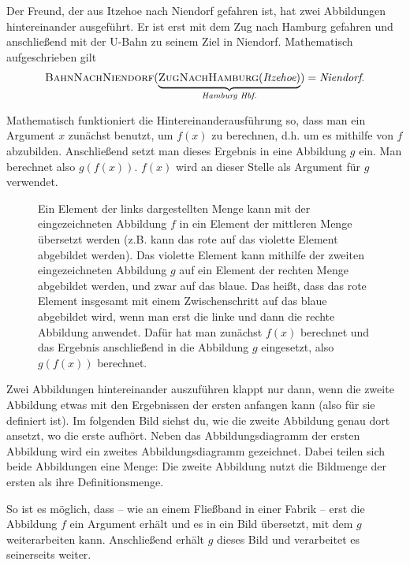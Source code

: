 \documentclass[../../main.tex]{subfiles}
\begin{document}
\begin{example}
    Der Freund, der aus Itzehoe nach Niendorf gefahren ist, hat zwei Abbildungen hintereinander ausgeführt. Er ist erst mit dem Zug nach Hamburg gefahren und anschließend mit der U-Bahn zu seinem Ziel in Niendorf. Mathematisch aufgeschrieben gilt \[\textsc{BahnNachNiendorf}(\underbrace{\textsc{ZugNachHamburg}(\emph{Itzehoe})}_{\emph{Hamburg Hbf.}})=\emph{Niendorf}.\]
\end{example}

Mathematisch funktioniert die Hintereinanderausführung so, dass man ein Argument $x$ zunächst benutzt, um $f(x)$ zu berechnen, d.h. um es mithilfe von $f$ abzubilden. Anschließend setzt man dieses Ergebnis in eine Abbildung $g$ ein. Man berechnet also $g(f(x))$. $f(x)$ wird an dieser Stelle als Argument für $g$ verwendet.

\begin{figure}[h!]
    \centering
    
    \caption{Ein Element der links dargestellten Menge kann mit der eingezeichneten Abbildung $f$ in ein Element der mittleren Menge übersetzt werden (z.B. kann das rote auf das violette Element abgebildet werden). Das violette Element kann mithilfe der zweiten eingezeichneten Abbildung $g$ auf ein Element der rechten Menge abgebildet werden, und zwar auf das blaue. Das heißt, dass das rote Element insgesamt mit einem Zwischenschritt auf das blaue abgebildet wird, wenn man erst die linke und dann die rechte Abbildung anwendet. Dafür hat man zunächst $f(x)$ berechnet und das Ergebnis anschließend in die Abbildung $g$ eingesetzt, also $g(f(x))$ berechnet.}
\end{figure}

Zwei Abbildungen hintereinander auszuführen klappt nur dann, wenn die zweite Abbildung etwas mit den Ergebnissen der ersten anfangen kann (also für sie definiert ist). Im folgenden Bild siehst du, wie die zweite Abbildung genau dort ansetzt, wo die erste aufhört. Neben das Abbildungsdiagramm der ersten Abbildung wird ein zweites Abbildungsdiagramm gezeichnet. Dabei teilen sich beide Abbildungen eine Menge: Die zweite Abbildung nutzt die Bildmenge der ersten als ihre Definitionsmenge.

So ist es möglich, dass -- wie an einem Fließband in einer Fabrik -- erst die Abbildung $f$ ein Argument erhält und es in ein Bild übersetzt, mit dem $g$ weiterarbeiten kann. Anschließend erhält $g$ dieses Bild und verarbeitet es seinerseits weiter.
\end{document}

